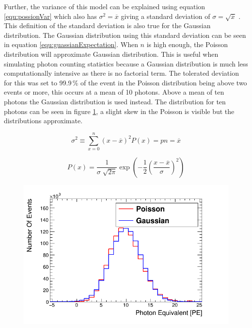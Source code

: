 Further, the variance of this model can be explained using equation  \ref{equ:possionVar} which also has $\sigma^2 = \overline{x}$ giving a standard deviation of $\sigma = \sqrt{\overline{x}}$ \cite{knoll_2010}. This definition of the standard deviation is also true for the Gaussian distribution. The Gaussian distribution using this standard deviation can be seen in equation \ref{equ:guassianExpectation}. When $n$ is high enough, the Poisson distribution will approximate Gaussian distribution. This is useful when simulating photon counting statistics because a Gaussian distribution is much less computationally intensive as there is no factorial term. The tolerated deviation for this was set to 99.9\,\% of the event in the Poisson distribution being above two events or more, this occurs at a mean of 10 photons. Above a mean of ten photons the Gaussian distribution is used instead. The distribution for ten photons can be seen in figure \ref{fig:CoutingStats10}, a slight skew in the Poisson is visible but the distributions approximate.

\begin{equation}
\sigma ^2 \equiv \sum_{x=0}^{n} (x-\overline{x})^2 P(x) = pn = \overline{x} 
\label{equ:possionVar}
\end{equation}

\begin{equation}
P(x) = \frac{1}{\sigma \sqrt[]{2 \pi}} \exp \left(-\frac{1}{2}\left(\frac{x-\overline{x}}{\sigma}\right)^{2}\right)
\label{equ:guassianExpectation}
\end{equation}

\begin{figure}[!h]
 \centering
 \includegraphics[width=0.7\linewidth]{Chapter4/Figs/poissionGaussian10Graph.png}
 \label{fig:CoutingStats10}
\end{figure}

